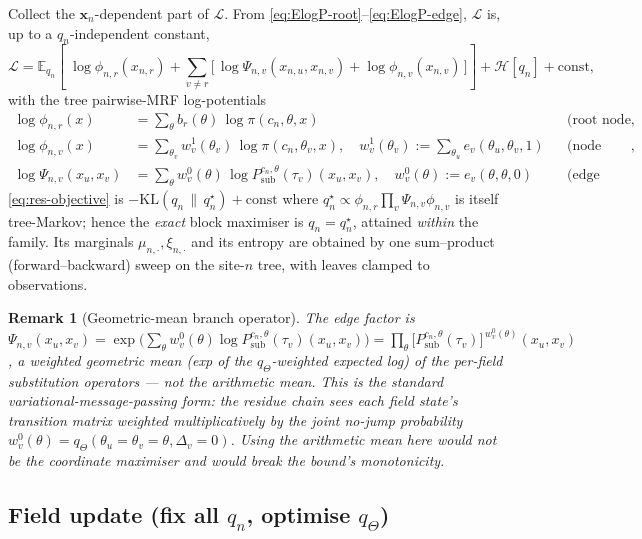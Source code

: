 \documentclass[11pt]{article}
\newtheorem{remark}{Remark}
\newcommand{\bx}{\bm{x}}
\newcommand{\Eq}[2]{\mathbb{E}_{#1}\!\left[#2\right]}
\newcommand{\KL}[2]{\mathrm{KL}\!\left(#1\,\|\,#2\right)}
\newcommand{\Ent}[1]{\mathcal{H}\!\left[#1\right]}
\newcommand{\Psub}{P_{\mathrm{sub}}}
\begin{document}
Collect the $\bx_n$-dependent part of $\mathcal L$. From
\eqref{eq:ElogP-root}--\eqref{eq:ElogP-edge}, $\mathcal L$ is, up to a
$q_n$-independent constant,
\begin{equation}
\mathcal L = \Eq{q_n}{\;\log\phi_{n,r}(x_{n,r})
   + \sum_{v\neq r}\big[\,\log\Psi_{n,v}(x_{n,u},x_{n,v}) + \log\phi_{n,v}(x_{n,v})\,\big]}
   + \Ent{q_n} + \mathrm{const},
\label{eq:res-objective}
\end{equation}
with the tree pairwise-MRF log-potentials
\begin{align}
\log\phi_{n,r}(x) &= \sum_\theta b_r(\theta)\,\log\pi(c_n,\theta,x)
   &&\text{(root node potential)},\label{eq:phi-root}\\
\log\phi_{n,v}(x) &= \sum_{\theta_v} w^{1}_{v}(\theta_v)\,\log\pi(c_n,\theta_v,x),\quad
   w^{1}_v(\theta_v):=\!\sum_{\theta_u}\! e_v(\theta_u,\theta_v,1)
   &&\text{(node potential from renewal)},\label{eq:phi-node}\\
\log\Psi_{n,v}(x_u,x_v) &= \sum_\theta w^{0}_v(\theta)\,
   \log\Psub^{c_n,\theta}(\tau_v)(x_u,x_v),\quad
   w^{0}_v(\theta):=e_v(\theta,\theta,0)
   &&\text{(edge potential).}\label{eq:psi-edge}
\end{align}
\eqref{eq:res-objective} is $-\KL{q_n}{q_n^\star}+\mathrm{const}$ where
$q_n^\star\propto\phi_{n,r}\prod_v\Psi_{n,v}\phi_{n,v}$ is itself
tree-Markov; hence the \emph{exact} block maximiser is $q_n=q_n^\star$,
attained \emph{within} the family. Its marginals $\mu_{n,\cdot},\xi_{n,\cdot}$
and its entropy are obtained by one sum--product (forward--backward) sweep on
the site-$n$ tree, with leaves clamped to observations.

\begin{remark}[Geometric-mean branch operator]
The edge factor is
$\Psi_{n,v}(x_u,x_v)=\exp\!\big(\sum_\theta w^0_v(\theta)\log\Psub^{c_n,\theta}(\tau_v)(x_u,x_v)\big)
 = \prod_\theta\big[\Psub^{c_n,\theta}(\tau_v)\big]^{\,w^0_v(\theta)}(x_u,x_v)$,
a \emph{weighted geometric mean} (exp of the $q_\Theta$-weighted expected log)
of the per-field substitution operators --- \emph{not} the arithmetic mean.
This is the standard variational-message-passing form: the residue chain sees
each field state's transition matrix weighted \emph{multiplicatively} by the
joint no-jump probability $w^0_v(\theta)=q_\Theta(\theta_u{=}\theta_v{=}\theta,\Delta_v{=}0)$.
Using the arithmetic mean here would not be the coordinate maximiser and would
break the bound's monotonicity.
\end{remark}

\subsection{Field update (fix all $q_n$, optimise $q_\Theta$)}
\label{sec:field-update}
\end{document}
